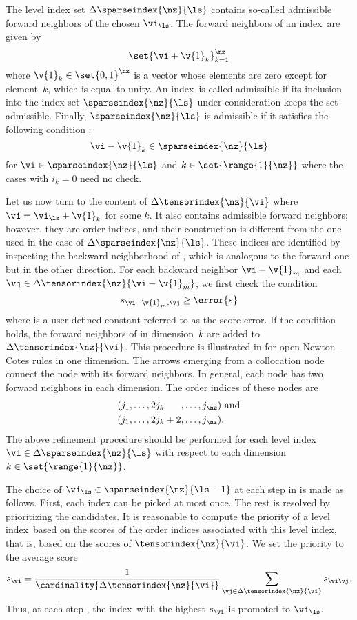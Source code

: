 The level index set $\Delta\sparseindex{\nz}{\ls}$ contains so-called admissible
forward neighbors of the chosen $\vi_{\ls}$. The forward neighbors of an
index~\vi are given by
\[
  \set{\vi + \v{1}_k}_{k = 1}^\nz
\]
where $\v{1}_k \in \set{0, 1}^\nz$ is a vector whose elements are zero except
for element~$k$, which is equal to unity. An index~\vi is called admissible if
its inclusion into the index set $\sparseindex{\nz}{\ls}$ under consideration
keeps the set admissible. Finally, $\sparseindex{\nz}{\ls}$ is admissible if it
satisfies the following condition \cite{klimke2006}:
\[
  \vi - \v{1}_k \in \sparseindex{\nz}{\ls}
\]
for $\vi \in \sparseindex{\nz}{\ls}$ and $k \in \set{\range{1}{\nz}}$ where the
cases with $i_k = 0$ need no check.

Let us now turn to the content of $\Delta\tensorindex{\nz}{\vi}$ where $\vi =
\vi_{\ls} + \v{1}_k$ for some $k$. It also contains admissible forward
neighbors; however, they are order indices, and their construction is different
from the one used in the case of $\Delta\sparseindex{\nz}{\ls}$. These indices
are identified by inspecting the backward neighborhood of \vi, which is
analogous to the forward one but in the other direction. For each backward
neighbor $\vi - \v{1}_m$ and each $\vj \in \Delta\tensorindex{\nz}{\vi -
\v{1}_m}$, we first check the condition
\[
  s_{\vi - \v{1}_m, \vj} \geq \error{s}
\]
where  is a user-defined constant referred to as the score error. If
the condition holds, the forward neighbors of \vj in dimension~$k$ are added to
$\Delta\tensorindex{\nz}{\vi}$. This procedure is illustrated in
 for open Newton--Cotes rules in one dimension. The arrows
emerging from a collocation node connect the node with its forward neighbors. In
general, each node has two forward neighbors in each dimension. The order
indices of these nodes are
\begin{align*}
  & (j_1, \dots, 2 j_k \phantom{{} + 2}, \dots, j_{\nz}) \text{ and} \\
  & (j_1, \dots, 2 j_k + 2,              \dots, j_{\nz}).
\end{align*}
The above refinement procedure should be performed for each level index $\vi \in
\Delta\sparseindex{\nz}{\ls}$ with respect to each dimension $k \in
\set{\range{1}{\nz}}$.

The choice of $\vi_{\ls} \in \sparseindex{\nz}{\ls - 1}$ at each step \ls in
 is made as follows. First, each index can be picked at
most once. The rest is resolved by prioritizing the candidates. It is reasonable
to compute the priority of a level index~\vi based on the scores of the order
indices associated with this level index, that is, based on the scores of
$\tensorindex{\nz}{\vi}$. We set the priority to the average score
\[
  s_{\vi} = \frac{1}{\cardinality{\Delta\tensorindex{\nz}{\vi}}} \sum_{\vj \in \Delta\tensorindex{\nz}{\vi}} s_{\vi \vj}.
\]
Thus, at each step \ls, the index~\vi with the highest $s_{\vi}$ is promoted to
$\vi_{\ls}$.

